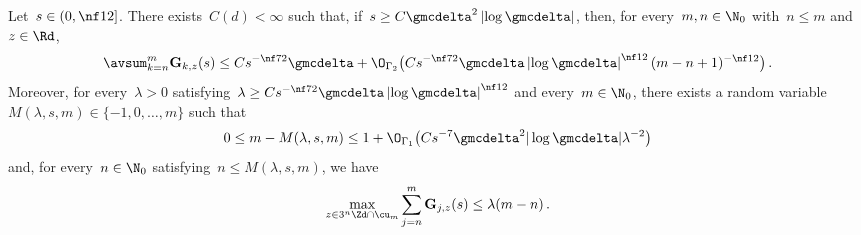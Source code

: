 \documentclass[11pt]{amsart}
\begin{document}
\begin{lemma}
\label{l.sum.the.errors}
Let~$s \in (0,\nf 12]$. There exists~$C(d)<\infty$ such that, if~$s \geq C \gmcdelta^2 \left| \log \gmcdelta \right|$, then, for every~$m,n \in\N_0$ with~$n\leq m$ and~$z \in \Rd$,
\begin{equation}
	\avsum_{k=n}^{m}
	\mathbf{G}_{k,z}(s)
	\leq
	Cs^{-\nf 72}   \gmcdelta + \O_{\Gamma_2}\bigl( C s^{-\nf 72}  \gmcdelta \left| \log \gmcdelta \right| ^{\nf 12}  (m-n+1)^{-\nf12} \bigr)
	\,.
	\label{e.after.good.scales.uniform}
\end{equation}
Moreover, for every~$\lambda > 0$ satisfying~$\lambda \geq Cs^{-\nf 72}  \gmcdelta \left| \log \gmcdelta \right|^{\nf 12} $ and every~$m\in\N_0$, there exists a random variable~$M(\lambda,s,m)\in\{-1,0,\ldots,m\}$ such that
\begin{equation}
	0\leq m-M(\lambda,s,m)
	\leq
	1+\O_{\Gamma_1}\bigl(
	Cs^{-7}\gmcdelta^2|\log\gmcdelta|\lambda^{-2}
	\bigr)
	\label{e.M.lambda.m.bound}
\end{equation}
and, for every~$n \in \N_0$ satisfying~$n \leq M(\lambda,s,m)$, we have
\begin{equation}
	\max_{z \in 3^n \Zd \cap \cu_m}
	\sum_{j=n}^{m}
	\mathbf{G}_{j,z}(s)
	\leq
	\lambda (m-n) \,.
	\label{e.after.good.scales}
\end{equation}
\end{lemma}
\end{document}
